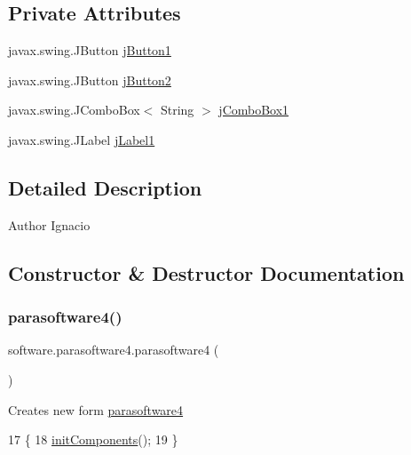 \subsection*{Private Attributes}
\begin{DoxyCompactItemize}
\item 
javax.\+swing.\+J\+Button \mbox{\hyperlink{classsoftware_1_1parasoftware4_a0c714f857c09b57977dcab3d49056a17}{j\+Button1}}
\item 
javax.\+swing.\+J\+Button \mbox{\hyperlink{classsoftware_1_1parasoftware4_aefe98fde668b50160e97144d76536de8}{j\+Button2}}
\item 
javax.\+swing.\+J\+Combo\+Box$<$ String $>$ \mbox{\hyperlink{classsoftware_1_1parasoftware4_a0573e3c63f0f22f99ad45722e4575431}{j\+Combo\+Box1}}
\item 
javax.\+swing.\+J\+Label \mbox{\hyperlink{classsoftware_1_1parasoftware4_a5298ea7ec05625113d0f4c0bfcd0c801}{j\+Label1}}
\end{DoxyCompactItemize}


\subsection{Detailed Description}
\begin{DoxyAuthor}{Author}
Ignacio 
\end{DoxyAuthor}


\subsection{Constructor \& Destructor Documentation}
\mbox{\label{classsoftware_1_1parasoftware4_a045ccbe7058acf5332dae140a7c6485d}} 
\subsubsection{\texorpdfstring{parasoftware4()}{parasoftware4()}}
{\footnotesize\ttfamily software.\+parasoftware4.\+parasoftware4 (\begin{DoxyParamCaption}{ }\end{DoxyParamCaption})\hspace{0.3cm}{\ttfamily [inline]}}

Creates new form \mbox{\hyperlink{classsoftware_1_1parasoftware4}{parasoftware4}} 
\begin{DoxyCode}
17                            \{
18         \mbox{\hyperlink{classsoftware_1_1parasoftware4_aa234754657f1e30dfbe2fcb910bc7d0a}{initComponents}}();
19     \}
\end{DoxyCode}


